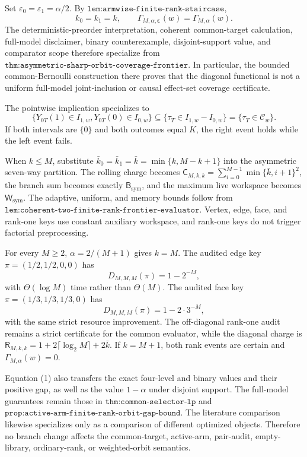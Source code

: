 Set \(\varepsilon_0=\varepsilon_1=\alpha/2\). By \(\texttt{lem:armwise-finite-rank-staircase}\),
\[
k_0=k_1=k,\qquad\Gamma_{M,\alpha,\boldsymbol\varepsilon}(w)=\Gamma_{M,\alpha}(w).
\tag{1}
\]
The deterministic-preorder interpretation, coherent common-target calculation, full-model disclaimer, binary counterexample, disjoint-support value, and comparator scope therefore specialize from \(\texttt{thm:asymmetric-sharp-orbit-coverage-frontier}\). In particular, the bounded common-Bernoulli construction there proves that the diagonal functional is not a uniform full-model joint-inclusion or causal effect-set coverage certificate.

The pointwise implication specializes to
\[
\{Y_{0T}(1)\in I_{1,w},Y_{0T}(0)\in I_{0,w}\}\subseteq\{\tau_T\in I_{1,w}-I_{0,w}\}=\{\tau_T\in\mathcal C_w\}.
\tag{2}
\]
If both intervals are \(\{0\}\) and both outcomes equal \(K\), the right event holds while the left event fails.

When \(k\le M\), substitute \(\bar k_0=\bar k_1=\bar k=\min\{k,M-k+1\}\) into the asymmetric seven-way partition. The rolling charge becomes \(\mathsf C_{M,k,k}=\sum_{i=0}^{M-1}\min\{\bar k,i+1\}^2\), the branch sum becomes exactly \(\mathsf B_{\mathrm{sym}}\), and the maximum live workspace becomes \(\mathsf W_{\mathrm{sym}}\). The adaptive, uniform, and memory bounds follow from \(\texttt{lem:coherent-two-finite-rank-frontier-evaluator}\). Vertex, edge, face, and rank-one keys use constant auxiliary workspace, and rank-one keys do not trigger factorial preprocessing.

For every \(M\ge2\), \(\alpha=2/(M+1)\) gives \(k=M\). The audited edge key \(\pi=(1/2,1/2,0,0)\) has
\[
D_{M,M,M}(\pi)=1-2^{-M},
\]
with \(\Theta(\log M)\) time rather than \(\Theta(M)\). The audited face key \(\pi=(1/3,1/3,1/3,0)\) has
\[
D_{M,M,M}(\pi)=1-2\cdot3^{-M},
\]
with the same strict resource improvement. The off-diagonal rank-one audit remains a strict certificate for the common evaluator, while the diagonal charge is \(\mathsf R_{M,k,k}=1+2\lceil\log_2M\rceil+2\bar k\). If \(k=M+1\), both rank events are certain and \(\Gamma_{M,\alpha}(w)=0\).

Equation (1) also transfers the exact four-level and binary values and their positive gap, as well as the value \(1-\alpha\) under disjoint support. The full-model guarantees remain those in \(\texttt{thm:common-selector-lp}\) and \(\texttt{prop:active-arm-finite-rank-orbit-gap-bound}\). The literature comparison likewise specializes only as a comparison of different optimized objects. Therefore no branch change affects the common-target, active-arm, pair-audit, empty-library, ordinary-rank, or weighted-orbit semantics.